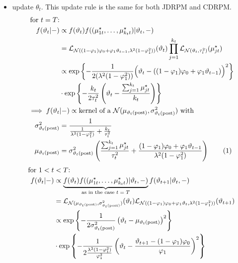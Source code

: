 \documentclass[12pt,	%
	a4paper,		%
	twoside,		%
	openright,		%
	titlepage,%
	]{book}
\theoremstyle{definition}
\begin{document}
\begin{itemize}
\item update $\theta_t$. This update rule is the same for both JDRPM and CDRPM.
\begin{align*}
    \text{for $t=T$:}&\\
    f(\theta_t|-)&\propto f(\theta_t)f((\mu^\star_{1t},\ldots,\mu^\star_{k_tt})|\theta_t,-)\\
    &=\law_{\N((1-\phi_1)\phi_0 + \phi_1\theta_{t-1},\lambda^2(1-\phi_1^2))}(\theta_t)\prod_{j=1}^{k_t} \law_{\N(\theta_t,\tau^2_t)}(\mu^\star_{jt})\\
    &\propto\expp{-\frac{1}{2(\lambda^2(1-\phi_1^2))}\Big(\theta_t - ((1-\phi_1)\phi_0+\phi_1\theta_{t-1})\Big)^2}\\
    &\cdot \expp{-\frac{k_t}{2\tau^2_t}\left(\theta_t - \frac{\sum_{j=1}^{k_t}\mu^\star_{jt}}{k_t}\right)}\\
    \implies f(\theta_t&|-)\propto \text{kernel of a $\N(\mu_{\postp{\theta_t}},\sigma^2_{\postp{\theta_t}})$ with}\\
    \sigma^2_{\postp{\theta_t}}&=\dfrac{1}{\frac{1}{\lambda^2(1-\phi_1^2)}+\frac{k_t}{\tau_t^2}}\\
    \mu_{\postp{\theta_t}}&=\sigma^2_{\postp{\theta_t}}\left(\frac{\sum_{j=1}^{k_t}\mu^\star_{jt}}{\tau^2_t} + \frac{(1-\phi_1)\phi_0+\phi_1\theta_{t-1}}{\lambda^2(1-\phi_1^2)} \right)
    \tag{\stepcounter{equation}\theequation}
\end{align*}
\begin{align*}
    \text{for } 1<t&<T\text{:}\\
    f(\theta_t|-)&\propto \underbrace{f(\theta_t)f((\mu^\star_{1t},\ldots,\mu^\star_{k_tt})|\theta_t,-)}_{\text{as in the case $t=T$}} f(\theta_{t+1}|\theta_t,-)\\
    &=\law_{\N( \mu_{\postp{\theta_t}},\sigma^2_{\postp{\theta_t}})}(\theta_t) \law_{\N((1-\phi_1)\phi_0 + \phi_1\theta_{t},\lambda^2(1-\phi_1^2))}(\theta_{t+1})\\
    &\propto\expp{-\frac{1}{2\sigma^2_{\postp{\theta_t}}}\left(\theta_t -\mu_{\postp{\theta_t}}\right)^2}\\& \cdot \expp{-\frac{1}{2\frac{\lambda^2(1-\phi_1^2)}{\phi_1^2}}\left(\theta_t - \frac{\theta_{t+1}-(1-\phi_1)\phi_0}{\phi_1}\right)^2}\\

\end{align*}
\end{itemize}
\end{document}
